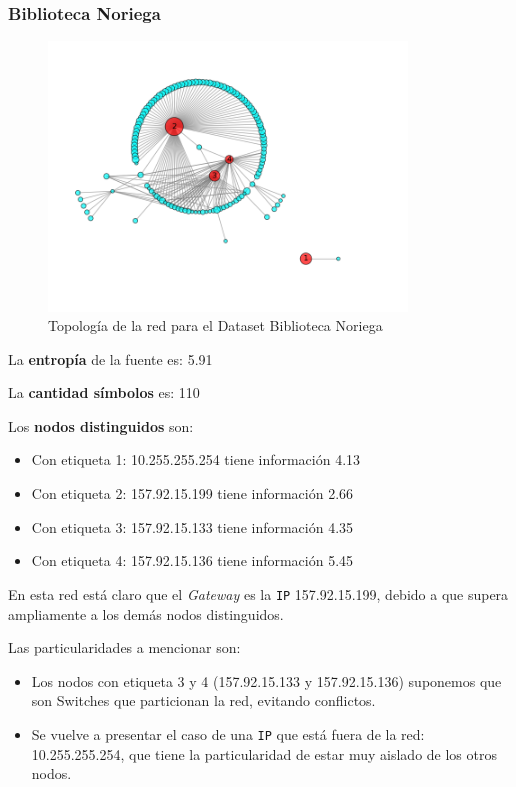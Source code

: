 \subsubsection{Biblioteca Noriega}

\begin{figure}[H]
    \centering
    \includegraphics[width=0.85\textwidth]{imagenes/noriega.png}
    \caption{Topología de la red para el Dataset Biblioteca Noriega}
\end{figure}

La \textbf{entropía} de la fuente es: 5.91

La \textbf{cantidad símbolos} es: 110

Los \textbf{nodos distinguidos} son:

\begin{itemize}
    \item Con etiqueta 1: 10.255.255.254 tiene información 4.13
    \item Con etiqueta 2: 157.92.15.199 tiene información 2.66
    \item Con etiqueta 3: 157.92.15.133 tiene información 4.35
    \item Con etiqueta 4: 157.92.15.136 tiene información 5.45
\end{itemize}

En esta red está claro que el \textit{Gateway} es la \texttt{IP} 157.92.15.199, debido a que
supera ampliamente a los demás nodos distinguidos.

Las particularidades a mencionar son:
\begin{itemize}
    \item Los nodos con etiqueta 3 y 4 (157.92.15.133 y 157.92.15.136) suponemos
        que son Switches que particionan la red, evitando conflictos.
    \item  Se vuelve a presentar el caso de una \texttt{IP} que está fuera de la red: 10.255.255.254, que tiene la particularidad de estar muy aislado de los otros nodos.
\end{itemize}



